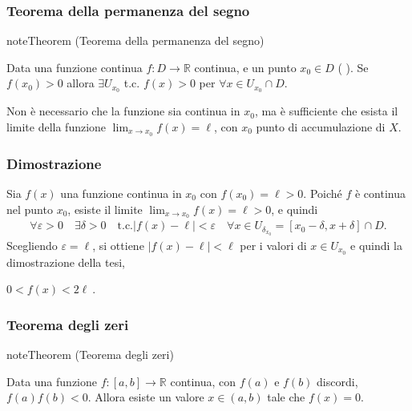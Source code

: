 \documentclass[letterpaper,10pt,italian]{jupyterBook}
\begin{document}
\subsubsection{Teorema della permanenza del segno}
\label{\detokenize{ch/infinitesimal_calculus/analysis:teorema-della-permanenza-del-segno}}\label{\detokenize{ch/infinitesimal_calculus/analysis:infinitesimal-calculus-continuous-fun-thms-sign}}\label{None:thm:infinitesimal-calculus:continuous-fun:thms:sign}
\begin{sphinxadmonition}{note}{Theorem  (Teorema della permanenza del segno)}



\sphinxAtStartPar
Data una funzione continua \(f: D \rightarrow \mathbb{R}\) continua, e un punto \(x_0 \in D\) ( ). Se \(f(x_0) > 0\) allora \(\exists U_{x_0}\) t.c. \(f(x) > 0\) per \(\forall x \in U_{x_0} \cap D\).
\end{sphinxadmonition}

\sphinxAtStartPar
{} Non è necessario che la funzione sia continua in \(x_0\), ma è sufficiente che esista il limite della funzione \(\lim_{x \rightarrow x_0} f(x) = \ell\), con \(x_0\) punto di accumulazione di \(X\).
\subsubsection*{Dimostrazione}

\sphinxAtStartPar
Sia \(f(x)\) una funzione continua in \(x_0\) con \(f(x_0) = \ell > 0\). Poiché \(f\) è continua nel punto \(x_0\), esiste il limite \(\lim_{x \rightarrow x_0} f(x) = \ell > 0\), e quindi
\begin{equation*}
\begin{split}\forall \varepsilon > 0 \quad \exists \delta > 0 \quad \text{t.c.} |f(x) - \ell| < \varepsilon \quad \forall x \in U_{\delta_{x_0}} = [ x_0 - \delta, x + \delta] \cap D . \end{split}
\end{equation*}
\sphinxAtStartPar
Scegliendo \(\varepsilon = \ell\), si ottiene \(|f(x) - \ell| < \ell\) per i valori di \(x \in U_{x_0}\) e quindi la dimostrazione della tesi,

\sphinxAtStartPar
\(0 < f(x) < 2 \ell \ .\)


\subsubsection{Teorema degli zeri}
\label{\detokenize{ch/infinitesimal_calculus/analysis:teorema-degli-zeri}}\label{\detokenize{ch/infinitesimal_calculus/analysis:infinitesimal-calculus-continuous-fun-thms-zeros}}\label{None:thm:infinitesimal-calculus:continuous-fun:thms:zeros}
\begin{sphinxadmonition}{note}{Theorem  (Teorema degli zeri)}



\sphinxAtStartPar
Data una funzione \(f: [a,b] \rightarrow \mathbb{R}\) continua, con \(f(a)\) e \(f(b)\) discordi, \(f(a) f(b) < 0\). Allora esiste un valore \(x \in (a,b)\) tale che \(f(x) = 0\).
\end{sphinxadmonition}
\end{document}
